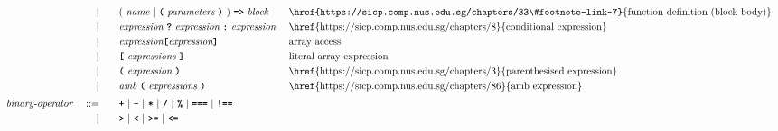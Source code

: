 \begin{alignat*}{9}
&&                       && |   &\quad &&   (\ \textit{name}\ | \
                                               \textbf{\texttt{(}}\ \textit{parameters}\ \textbf{\texttt{)}}\
                                            )\    
                                            \texttt{\textbf{=>}}\ \textit{block}
                                                           && \textrm{\href{https://sicp.comp.nus.edu.sg/chapters/33\#footnote-link-7}{function definition (block body)}} \\
&&                       && |   &\quad &&   \textit{expression} \ \textbf{\texttt{?}}\ 
                                            \textit{expression}
                                            \ \textbf{\texttt{:}}\
                                            \textit{expression}\
                                                           && \textrm{\href{https://sicp.comp.nus.edu.sg/chapters/8}{conditional expression}} \\
&&                       && |   &\quad && \textit{expression} \textbf{\texttt{[}}
                                          \textit{expression} \textbf{\texttt{]}}
                                                           && \textrm{array access} \\
&&                       && |   &\quad &&   \textbf{\texttt{[}}\ 
                                            \textit{expressions}\
                                            \textbf{\texttt{]}}
                                                           && \textrm{literal array expression}\\
&&                       && |   &\quad &&  \textbf{\texttt{(}}\  \textit{expression} \ 
                                            \textbf{\texttt{)}} && \textrm{\href{https://sicp.comp.nus.edu.sg/chapters/3}{parenthesised expression}}\\
&&                       && |  &\quad && \textit{amb} \
                                         \textbf{\texttt{(}}\
                                         \textit{\textit{expressions}}\
                                         \textbf{\texttt{)}}\ && \textrm{\href{https://sicp.comp.nus.edu.sg/chapters/86}{amb expression}}\\[1mm]
&& \textit{binary-operator}    \ 
                        && ::= &\quad && \textbf{\texttt{+}}\ |\ \textbf{\texttt{-}}\ |\ \textbf{\texttt{*}}\ |\ \textbf{\texttt{/}}\ |\ \textbf{\texttt{\%}}\ |\ 
                                   \textbf{\texttt{===}}\ |\ \textbf{\texttt{!==}}\ \\
&&                       && |  &\quad &&  \texttt{\textbf{>}}\ |\ \texttt{\textbf{<}}\ |\ \texttt{\textbf{>=}}\ |\ \texttt{\textbf{<=}}\

\end{alignat*}
